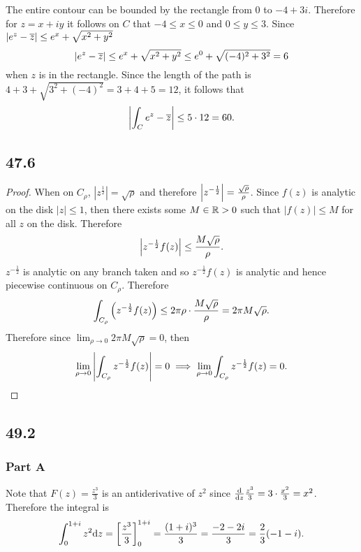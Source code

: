 \documentclass[12pt,titlepage]{extarticle}
\begin{document}
The entire contour can be bounded by the rectangle from $0$ to $-4 + 3i$. Therefore for $z = x + iy$ it follows on $C$ that $-4 \leq x \leq 0$ and $0 \leq y \leq 3$. Since $|e^z - \overline{z}| \leq e^{x} + \sqrt{x^2 + y^2}$
\[
    |e^z - \overline{z}| \leq e^x + \sqrt{x^2 + y^2} \leq e^0 + \sqrt{(-4)^2 + 3^2} = 6
\]
when $z$ is in the rectangle. Since the length of the path is $4 + 3 + \sqrt{3^2 + (-4)^2} = 3 + 4 + 5 = 12$, it follows that
\[
    \qty|\int_C e^z - \overline{z}| \leq 5 \cdot 12 = 60
.\]

\subsection*{47.6}
\begin{proof}
    When on $C_{\rho}$, $|z^{\frac{1}{2}}| = \sqrt{\rho}$ and therefore $\qty|z^{-\frac{1}{2}}| = \frac{\sqrt{\rho}}{\rho}$. Since $f(z)$ is analytic on the disk $|z| \leq 1$, then there exists some $M \in \mathbb{R} > 0$ such that $|f(z)| \leq M$ for all $z$ on the disk. Therefore
    \[
        \qty|z^{-\frac{1}{2}} f(z)| \leq \frac{M \sqrt{\rho}}{\rho}
    .\]
    $z^{-\frac{1}{2}}$ is analytic on any branch taken and so $z^{-\frac{1}{2}} f(z)$ is analytic and hence piecewise continuous on $C_{\rho}$. Therefore
    \[
        \int_{C_{\rho}} \qty(z^{-\frac{1}{2}} f(z)) \leq 2 \pi \rho \cdot \frac{M \sqrt{\rho}}{\rho} = 2 \pi M \sqrt{\rho}
    .\]
    Therefore since $\lim_{\rho \to 0} 2 \pi M \sqrt{ \rho } = 0$, then
    \[
        \lim_{\rho \to 0} \qty|\int_{C_{\rho}} z^{-\frac{1}{2}} f(z)| = 0 \implies \lim_{\rho \to 0} \int_{C_{\rho}} z^{-\frac{1}{2}} f(z) = 0
    .\]
\end{proof}

\subsection*{49.2}
\subsubsection*{Part A}
Note that $F(z) = \frac{z^3}{3}$ is an antiderivative of $z^2$ since $\dv{z} \frac{z^{3}}{3} = 3 \cdot \frac{x^2}{3} = x^2$. Therefore the integral is 
\[
    \int_0^{1+i} z^2 \dd z = \qty[\frac{z^3}{3}]_0^{1+i} = \frac{(1+i)^3}{3} = \frac{-2 - 2 i}{3} = \frac{2}{3} (-1 - i)
.\]
\end{document}
